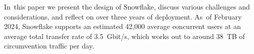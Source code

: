 \documentclass[letterpaper,twocolumn]{article}
\begin{document}
In~this paper we present the design of Snowflake,
discuss various challenges and considerations,
and reflect on over three years of deployment.
As~of February 2024, Snowflake supports an estimated 42,000 average concurrent users
at an average total transfer rate of 3.5~Gbit/s,
which works out to around 38~TB of circumvention traffic per day.
\end{document}
